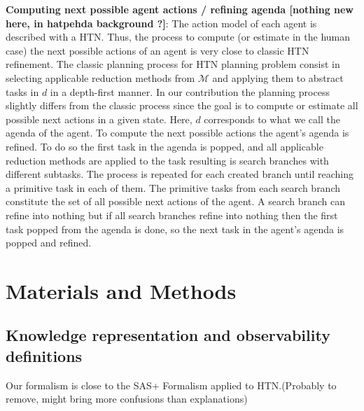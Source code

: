 \documentclass[letterpaper]{article} %
\begin{document}
\textbf{Computing next possible agent actions / refining agenda [nothing new here, in hatpehda background ?]}:
The action model of each agent is described with a HTN. Thus, the process to compute (or estimate in the human case) the next possible actions of an agent is very close to classic HTN refinement.
The classic planning process for HTN planning problem consist in selecting applicable reduction methods from $\mathcal{M}$ and applying them to abstract tasks in $d$ in a depth-first manner. In our contribution the planning process slightly differs from the classic process since the goal is to compute or estimate all possible next actions in a given state. 
Here, $d$ corresponds to what we call the agenda of the agent. To compute the next possible actions the agent's agenda is refined. To do so the first task in the agenda is popped, and all applicable reduction methods are applied to the task resulting is search branches with different subtasks. The process is repeated for each created branch until reaching a primitive task in each of them. The primitive tasks from each search branch constitute the set of all possible next actions of the agent.
A search branch can refine into nothing but if all search branches refine into nothing then the first task popped from the agenda is done, so the next task in the agent's agenda is popped and refined.  


\section{Materials and Methods}



\subsection{Knowledge representation and observability definitions}

Our formalism is close to the SAS+ Formalism applied to HTN.(Probably to remove, might bring more confusions than explanations)
\end{document}
